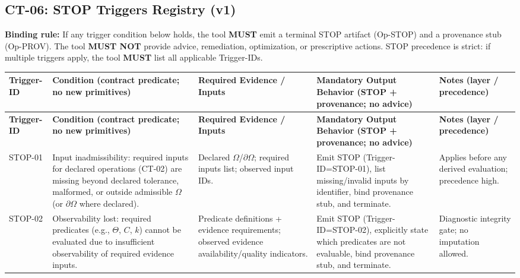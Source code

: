 \subsection{CT-06: STOP Triggers Registry (v1)}
\noindent\textbf{Binding rule:} If any trigger condition below holds, the tool \textbf{MUST} emit a terminal STOP artifact (Op-STOP) and a provenance stub (Op-PROV). The tool \textbf{MUST NOT} provide advice, remediation, optimization, or prescriptive actions. STOP precedence is strict: if multiple triggers apply, the tool \textbf{MUST} list all applicable Trigger-IDs.

\begingroup
\small
\setlength{\LTleft}{0pt}
\setlength{\LTright}{0pt}
\begin{longtable}{|p{1.8cm}|p{6.3cm}|p{4.1cm}|p{5.2cm}|p{3.0cm}|}
\hline
\textbf{Trigger-ID} & \textbf{Condition (contract predicate; no new primitives)} & \textbf{Required Evidence / Inputs} & \textbf{Mandatory Output Behavior (STOP + provenance; no advice)} & \textbf{Notes (layer / precedence)} \\
\hline
\endfirsthead

\hline
\textbf{Trigger-ID} & \textbf{Condition (contract predicate; no new primitives)} & \textbf{Required Evidence / Inputs} & \textbf{Mandatory Output Behavior (STOP + provenance; no advice)} & \textbf{Notes (layer / precedence)} \\
\hline
\endhead

\hline
\endfoot

\hline
\endlastfoot

STOP-01 &
Input inadmissibility: required inputs for declared operations (CT-02) are missing beyond declared tolerance, malformed, or outside admissible $\Omega$ (or $\partial\Omega$ where declared). &
Declared $\Omega$/$\partial\Omega$; required inputs list; observed input IDs. &
Emit STOP (Trigger-ID=STOP-01), list missing/invalid inputs by identifier, bind provenance stub, and terminate. &
Applies before any derived evaluation; precedence high. \\
\hline

STOP-02 &
Observability lost: required predicates (e.g., $\Theta$, $C$, $k$) cannot be evaluated due to insufficient observability of required evidence inputs. &
Predicate definitions + evidence requirements; observed evidence availability/quality indicators. &
Emit STOP (Trigger-ID=STOP-02), explicitly state which predicates are not evaluable, bind provenance stub, and terminate. &
Diagnostic integrity gate; no imputation allowed. \\
\hline


\end{longtable}
